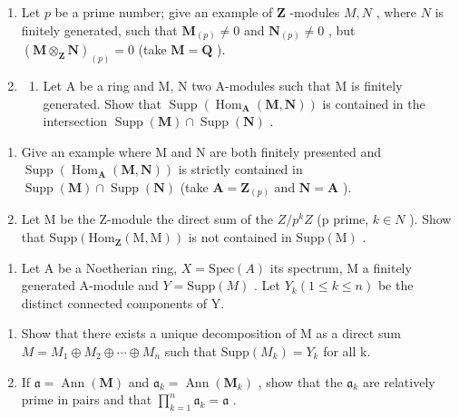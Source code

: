 \begin{enumerate}
\def\labelenumi{\arabic{enumi}.}
\setcounter{enumi}{22}
\item
  Let \(p\) be a prime number; give an example of \(\mathbf{Z}\) -modules \(M, N\) , where \(N\) is finitely generated, such that \(\mathbf{M}_{(p)} \neq 0\) and \(\mathbf{N}_{(p)} \neq 0\) , but \((\mathbf{M} \otimes_{\mathbf{Z}} \mathbf{N})_{(p)} = 0\) (take \(\mathbf{M} = \mathbf{Q}\) ).
\item
  \begin{enumerate}
  \def\labelenumii{(\alph{enumii})}
  \tightlist
  \item
    Let A be a ring and M, N two A-modules such that M is finitely generated. Show that \(\operatorname{Supp}(\operatorname{Hom}_{\mathbf{A}}(\mathbf{M}, \mathbf{N}))\) is contained in the intersection \(\operatorname{Supp}(\mathbf{M}) \cap \operatorname{Supp}(\mathbf{N})\) .
  \end{enumerate}
\end{enumerate}

\begin{enumerate}
\def\labelenumi{(\alph{enumi})}
\setcounter{enumi}{1}
\item
  Give an example where M and N are both finitely presented and \(\operatorname{Supp}(\operatorname{Hom}_{\mathbf{A}}(\mathbf{M},\mathbf{N}))\) is strictly contained in \(\operatorname{Supp}(\mathbf{M}) \cap \operatorname{Supp}(\mathbf{N})\) (take \(\mathbf{A} = \mathbf{Z}_{(p)}\) and \(\mathbf{N} = \mathbf{A}\) ).
\item
  Let M be the Z-module the direct sum of the \(Z/p^{k}Z\) (p prime, \(k \in N\) ). Show that \(\text{Supp}(\text{Hom}_{\mathbf{Z}}(\text{M}, \text{M}))\) is not contained in \(\text{Supp}(\text{M})\) .
\end{enumerate}

\begin{enumerate}
\def\labelenumi{\arabic{enumi}.}
\setcounter{enumi}{24}
\tightlist
\item
  Let A be a Noetherian ring, \(X = \text{Spec}(A)\) its spectrum, M a finitely generated A-module and \(Y = \text{Supp}(M)\) . Let \(Y_k (1 \leqslant k \leqslant n)\) be the distinct connected components of Y.
\end{enumerate}

\begin{enumerate}
\def\labelenumi{(\alph{enumi})}
\item
  Show that there exists a unique decomposition of M as a direct sum \(M = M_{1} \oplus M_{2} \oplus \cdots \oplus M_{n}\) such that \(\text{Supp}(M_{k}) = Y_{k}\) for all k.
\item
  If \(\mathfrak{a} = \operatorname{Ann}(\mathbf{M})\) and \(\mathfrak{a}_k = \operatorname{Ann}(\mathbf{M}_k)\) , show that the \(\mathfrak{a}_k\) are relatively prime in pairs and that \(\prod_{k=1}^{n} \mathfrak{a}_k = \mathfrak{a}\) .
\end{enumerate}

